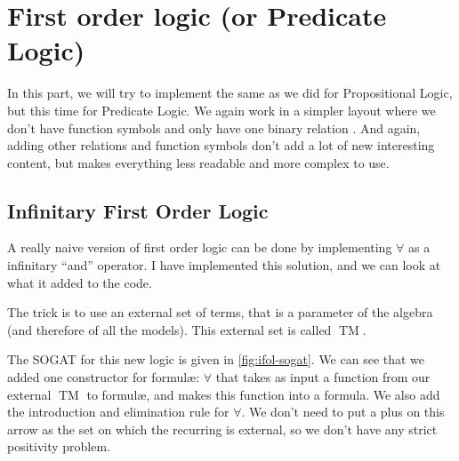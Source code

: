 \documentclass[10pt,a4paper]{article}
\begin{document}
	\section{First order logic (or Predicate Logic)}
	
		In this part, we will try to implement the same as we did for Propositional Logic, but this time for Predicate Logic. We again work in a simpler layout where we don't have function symbols and only have one binary relation . And again, adding other relations and function symbols don't add a lot of new interesting content, but makes everything less readable and more complex to use.
		
		\subsection{Infinitary First Order Logic}
		
			A really naive version of first order logic can be done by implementing $\forall$ as a infinitary \enquote{and} operator. I have implemented this solution, and we can look at what it added to the code.
		
			The trick is to use an external set of terms, that is a parameter of the algebra (and therefore of all the models). This external set is called $\operatorname{TM}$.
			
			The SOGAT for this new logic is given in \autoref{fig:ifol-sogat}. We can see that we added one constructor for formulæ: $\forall$ that takes as input a function from our external $\operatorname{TM}$ to formulæ, and makes this function into a formula. We also add the introduction and elimination rule for $\forall$. We don't need to put a plus on this arrow as the set on which the recurring is external, so we don't have any strict positivity problem.
			
\end{document}
